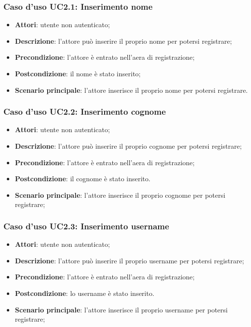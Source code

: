 \subsubsection{Caso d'uso UC2.1: Inserimento nome}
\begin{itemize}
\item \textbf{Attori}: utente non autenticato;
\item \textbf{Descrizione}: l'attore può inserire il proprio nome per potersi registrare;
\item \textbf{Precondizione}: l'attore è entrato nell'aera di registrazione;
\item \textbf{Postcondizione}: il nome è stato inserito;
\item \textbf{Scenario principale}: l'attore inserisce il proprio nome per potersi registrare.
\end{itemize}

\subsubsection{Caso d'uso UC2.2: Inserimento cognome}
\begin{itemize}
\item \textbf{Attori}: utente non autenticato;
\item \textbf{Descrizione}: l'attore può inserire il proprio cognome per potersi registrare;
\item \textbf{Precondizione}: l'attore è entrato nell'aera di registrazione;
\item \textbf{Postcondizione}: il cognome è stato inserito.
\item \textbf{Scenario principale}: l'attore inserisce il proprio cognome per potersi registrare;
\end{itemize}

\subsubsection{Caso d'uso UC2.3: Inserimento username}
\begin{itemize}
\item \textbf{Attori}: utente non autenticato;
\item \textbf{Descrizione}: l'attore può inserire il proprio username per potersi registrare;
\item \textbf{Precondizione}: l'attore è entrato nell'aera di registrazione;
\item \textbf{Postcondizione}: lo username è stato inserito.
\item \textbf{Scenario principale}: l'attore inserisce il proprio username per potersi registrare;
\end{itemize}

